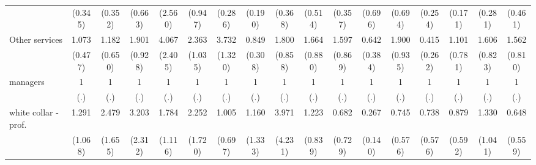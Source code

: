 {\begin{tabular}{l*{16}{c}}
                    &     (0.345)         &     (0.352)         &     (0.663)         &     (2.560)         &     (0.947)         &     (0.286)         &     (0.190)         &     (0.368)         &     (0.514)         &     (0.357)         &     (0.696)         &     (0.694)         &     (0.254)         &     (0.171)         &     (0.281)         &     (0.461)         \\
[1em]
Other services      &       1.073         &       1.182         &       1.901         &       4.067\sym{*}  &       2.363\sym{*}  &       3.732\sym{***}&       0.849         &       1.800         &       1.664         &       1.597         &       0.642         &       1.900         &       0.415         &       1.101         &       1.606         &       1.562         \\
                    &     (0.477)         &     (0.650)         &     (0.928)         &     (2.405)         &     (1.035)         &     (1.320)         &     (0.308)         &     (0.858)         &     (0.880)         &     (0.869)         &     (0.384)         &     (0.935)         &     (0.262)         &     (0.781)         &     (0.823)         &     (0.810)         \\
[1em]
managers            &           1         &           1         &           1         &           1         &           1         &           1         &           1         &           1         &           1         &           1         &           1         &           1         &           1         &           1         &           1         &           1         \\
                    &         (.)         &         (.)         &         (.)         &         (.)         &         (.)         &         (.)         &         (.)         &         (.)         &         (.)         &         (.)         &         (.)         &         (.)         &         (.)         &         (.)         &         (.)         &         (.)         \\
[1em]
white collar - prof.&       1.291         &       2.479         &       3.203         &       1.784         &       2.252         &       1.005         &       1.160         &       3.971         &       1.223         &       0.682         &       0.267\sym{*}  &       0.745         &       0.738         &       0.879         &       1.330         &       0.648         \\
                    &     (1.068)         &     (1.655)         &     (2.312)         &     (1.116)         &     (1.720)         &     (0.697)         &     (1.333)         &     (4.231)         &     (0.839)         &     (0.729)         &     (0.140)         &     (0.576)         &     (0.576)         &     (0.592)         &     (1.041)         &     (0.559)         \\

\end{tabular}}
